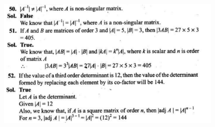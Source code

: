 \documentclass{article}
\begin{document}
\begin{figure}[H]
    \includegraphics[scale=0.5]{determinants_l3_ps_678.png}
\end{figure}


\clearpage
\end{document}
